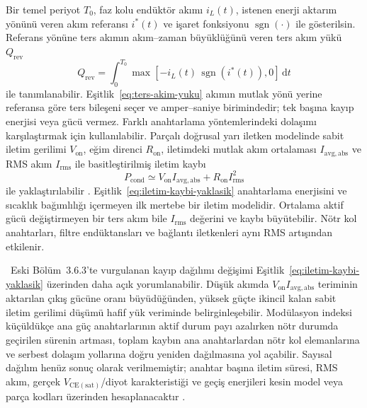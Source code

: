Bir temel periyot $T_0$, faz kolu endüktör akımı $i_L(t)$, istenen enerji aktarım yönünü veren akım referansı $i^{\ast}(t)$ ve işaret fonksiyonu $\operatorname{sgn}(\cdot)$ ile gösterilsin. Referans yönüne ters akımın akım--zaman büyüklüğünü veren ters akım yükü $Q_{\mathrm{rev}}$
\begin{equation}
  Q_{\mathrm{rev}}=\int_0^{T_0}\max\!\left[-i_L(t)\,\operatorname{sgn}\!\left(i^{\ast}(t)\right),0\right]\,\mathrm{d}t
  \label{eq:ters-akim-yuku}
\end{equation}
ile tanımlanabilir. Eşitlik~\eqref{eq:ters-akim-yuku} akımın mutlak yönü yerine referansa göre ters bileşeni seçer ve amper--saniye birimindedir; tek başına kayıp enerjisi veya gücü vermez. Farklı anahtarlama yöntemlerindeki dolaşımı karşılaştırmak için kullanılabilir. Parçalı doğrusal yarı iletken modelinde sabit iletim gerilimi $V_{\mathrm{on}}$, eğim direnci $R_{\mathrm{on}}$, iletimdeki mutlak akım ortalaması $I_{\mathrm{avg,abs}}$ ve RMS akım $I_{\mathrm{rms}}$ ile basitleştirilmiş iletim kaybı
\begin{equation}
  P_{\mathrm{cond}}\simeq V_{\mathrm{on}} I_{\mathrm{avg,abs}}+R_{\mathrm{on}}I_{\mathrm{rms}}^2
  \label{eq:iletim-kaybi-yaklasik}
\end{equation}
ile yaklaştırılabilir \citep{Chen2010,Schweizer2013}. Eşitlik~\eqref{eq:iletim-kaybi-yaklasik} anahtarlama enerjisini ve sıcaklık bağımlılığı içermeyen ilk mertebe bir iletim modelidir. Ortalama aktif gücü değiştirmeyen bir ters akım bile $I_{\mathrm{rms}}$ değerini ve kaybı büyütebilir. Nötr kol anahtarları, filtre endüktansları ve bağlantı iletkenleri aynı RMS artışından etkilenir.

\eskitezetiketi\ Eski Bölüm~3.6.3'te vurgulanan kayıp dağılımı değişimi Eşitlik~\eqref{eq:iletim-kaybi-yaklasik} üzerinden daha açık yorumlanabilir. Düşük akımda $V_{\mathrm{on}}I_{\mathrm{avg,abs}}$ teriminin aktarılan çıkış gücüne oranı büyüdüğünden, yüksek güçte ikincil kalan sabit iletim gerilimi düşümü hafif yük veriminde belirginleşebilir. Modülasyon indeksi küçüldükçe ana güç anahtarlarının aktif durum payı azalırken nötr durumda geçirilen sürenin artması, toplam kaybın ana anahtarlardan nötr kol elemanlarına ve serbest dolaşım yollarına doğru yeniden dağılmasına yol açabilir. Sayısal dağılım henüz sonuç olarak verilmemiştir; anahtar başına iletim süresi, RMS akım, gerçek $V_{\mathrm{CE(sat)}}$/diyot karakteristiği ve geçiş enerjileri kesin model veya parça kodları üzerinden hesaplanacaktır \citep{Schweizer2013,Wang2020,Chen2010}.

